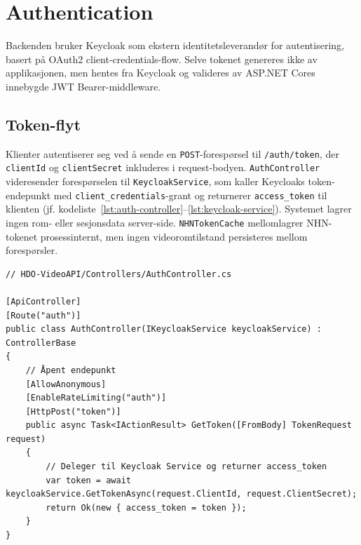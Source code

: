 \section{Authentication}
\label{sec:impl-auth}

Backenden bruker Keycloak som ekstern identitetsleverandør for autentisering, basert på OAuth2 client-credentials-flow. Selve tokenet genereres ikke av applikasjonen, men hentes fra Keycloak og valideres av ASP.NET Cores innebygde JWT Bearer-middleware.

\subsection{Token-flyt}

Klienter autentiserer seg ved å sende en \texttt{POST}-forespørsel til \texttt{/auth/token}, der \texttt{clientId} og \texttt{clientSecret} inkluderes i request-bodyen. \texttt{AuthController} videresender forespørselen til \texttt{KeycloakService}, som kaller Keycloaks token-endepunkt med \texttt{client\_credentials}-grant og returnerer \texttt{access\_token} til klienten (jf. kodeliste~\ref{lst:auth-controller}--\ref{lst:keycloak-service}). Systemet lagrer ingen rom- eller sesjonsdata server-side. \texttt{NHNTokenCache} mellomlagrer NHN-tokenet prosessinternt, men ingen videoromtilstand persisteres mellom forespørsler.

\begin{lstlisting}[language={[Sharp]C}, label=lst:auth-controller, caption={\texttt{AuthController.cs} – token-endepunkt}]
// HDO-VideoAPI/Controllers/AuthController.cs

[ApiController]
[Route("auth")]
public class AuthController(IKeycloakService keycloakService) : ControllerBase
{
    // Åpent endepunkt
    [AllowAnonymous]
    [EnableRateLimiting("auth")]
    [HttpPost("token")]
    public async Task<IActionResult> GetToken([FromBody] TokenRequest request)
    {
        // Deleger til Keycloak Service og returner access_token
        var token = await keycloakService.GetTokenAsync(request.ClientId, request.ClientSecret);
        return Ok(new { access_token = token });
    }
}
\end{lstlisting}

